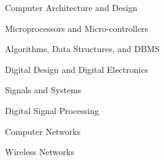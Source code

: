 \begin{multicols}{2}
\begin{cvitems}
	\item{Computer Architecture and Design}
	\item{Microprocessors and Micro-controllers}
    \item{Algorithms, Data Structures, and DBMS}
    \item{Digital Design and Digital Electronics}
    \item{Signals and Systems}
    \item{Digital Signal Processing}
    \item{Computer Networks}
    \item{Wireless Networks}
\end{cvitems}
\end{multicols}